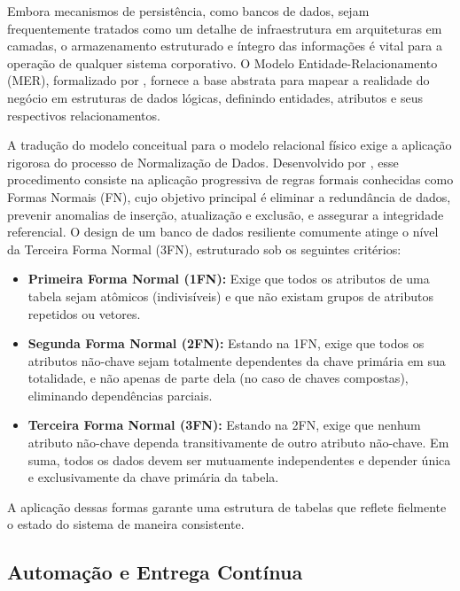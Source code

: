 \documentclass[article,a4paper,12pt,brazil,sumario=tradicional]{abntex2}
\begin{document}
Embora mecanismos de persistência, como bancos de dados, sejam frequentemente tratados como um detalhe de infraestrutura em arquiteturas em camadas, o armazenamento estruturado e íntegro das informações é vital para a operação de qualquer sistema corporativo. O Modelo Entidade-Relacionamento (MER), formalizado por , fornece a base abstrata para mapear a realidade do negócio em estruturas de dados lógicas, definindo entidades, atributos e seus respectivos relacionamentos.

A tradução do modelo conceitual para o modelo relacional físico exige a aplicação rigorosa do processo de Normalização de Dados. Desenvolvido por , esse procedimento consiste na aplicação progressiva de regras formais conhecidas como Formas Normais (FN), cujo objetivo principal é eliminar a redundância de dados, prevenir anomalias de inserção, atualização e exclusão, e assegurar a integridade referencial. O design de um banco de dados resiliente comumente atinge o nível da Terceira Forma Normal (3FN), estruturado sob os seguintes critérios:

\begin{itemize}
    \item \textbf{Primeira Forma Normal (1FN):} Exige que todos os atributos de uma tabela sejam atômicos (indivisíveis) e que não existam grupos de atributos repetidos ou vetores.
    \item \textbf{Segunda Forma Normal (2FN):} Estando na 1FN, exige que todos os atributos não-chave sejam totalmente dependentes da chave primária em sua totalidade, e não apenas de parte dela (no caso de chaves compostas), eliminando dependências parciais.
    \item \textbf{Terceira Forma Normal (3FN):} Estando na 2FN, exige que nenhum atributo não-chave dependa transitivamente de outro atributo não-chave. Em suma, todos os dados devem ser mutuamente independentes e depender única e exclusivamente da chave primária da tabela.
\end{itemize}

A aplicação dessas formas garante uma estrutura de tabelas que reflete fielmente o estado do sistema de maneira consistente.

\subsection{Automação e Entrega Contínua}
\end{document}
